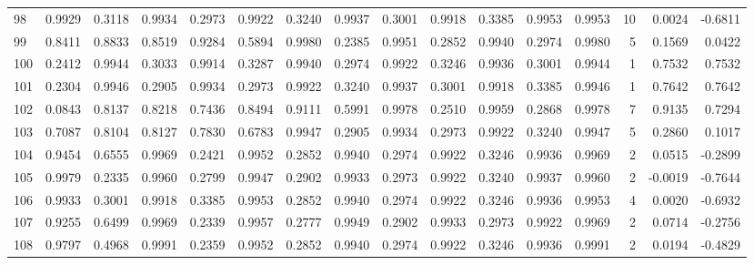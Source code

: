 \begin{tabular}{lrrrrrrrrrrrrrrr}
98  &      0.9929 &  0.3118 &  0.9934 &  0.2973 &  0.9922 &  0.3240 &  0.9937 &  0.3001 &  0.9918 &  0.3385 &   0.9953 &     0.9953 &     10 &                    0.0024 &                    -0.6811 \\
99  &      0.8411 &  0.8833 &  0.8519 &  0.9284 &  0.5894 &  0.9980 &  0.2385 &  0.9951 &  0.2852 &  0.9940 &   0.2974 &     0.9980 &      5 &                    0.1569 &                     0.0422 \\
100 &      0.2412 &  0.9944 &  0.3033 &  0.9914 &  0.3287 &  0.9940 &  0.2974 &  0.9922 &  0.3246 &  0.9936 &   0.3001 &     0.9944 &      1 &                    0.7532 &                     0.7532 \\
101 &      0.2304 &  0.9946 &  0.2905 &  0.9934 &  0.2973 &  0.9922 &  0.3240 &  0.9937 &  0.3001 &  0.9918 &   0.3385 &     0.9946 &      1 &                    0.7642 &                     0.7642 \\
102 &      0.0843 &  0.8137 &  0.8218 &  0.7436 &  0.8494 &  0.9111 &  0.5991 &  0.9978 &  0.2510 &  0.9959 &   0.2868 &     0.9978 &      7 &                    0.9135 &                     0.7294 \\
103 &      0.7087 &  0.8104 &  0.8127 &  0.7830 &  0.6783 &  0.9947 &  0.2905 &  0.9934 &  0.2973 &  0.9922 &   0.3240 &     0.9947 &      5 &                    0.2860 &                     0.1017 \\
104 &      0.9454 &  0.6555 &  0.9969 &  0.2421 &  0.9952 &  0.2852 &  0.9940 &  0.2974 &  0.9922 &  0.3246 &   0.9936 &     0.9969 &      2 &                    0.0515 &                    -0.2899 \\
105 &      0.9979 &  0.2335 &  0.9960 &  0.2799 &  0.9947 &  0.2902 &  0.9933 &  0.2973 &  0.9922 &  0.3240 &   0.9937 &     0.9960 &      2 &                   -0.0019 &                    -0.7644 \\
106 &      0.9933 &  0.3001 &  0.9918 &  0.3385 &  0.9953 &  0.2852 &  0.9940 &  0.2974 &  0.9922 &  0.3246 &   0.9936 &     0.9953 &      4 &                    0.0020 &                    -0.6932 \\
107 &      0.9255 &  0.6499 &  0.9969 &  0.2339 &  0.9957 &  0.2777 &  0.9949 &  0.2902 &  0.9933 &  0.2973 &   0.9922 &     0.9969 &      2 &                    0.0714 &                    -0.2756 \\
108 &      0.9797 &  0.4968 &  0.9991 &  0.2359 &  0.9952 &  0.2852 &  0.9940 &  0.2974 &  0.9922 &  0.3246 &   0.9936 &     0.9991 &      2 &                    0.0194 &                    -0.4829 \\

\end{tabular}
